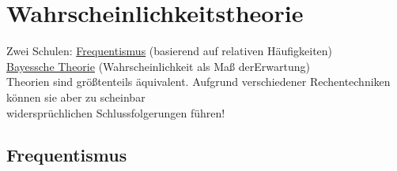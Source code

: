 \section{Wahrscheinlichkeitstheorie}
\begin{tabbing}
Zwei Schulen: \= \underline{Frequentismus} (basierend auf relativen Häufigkeiten)\\
\> \underline{Bayessche Theorie} (Wahrscheinlichkeit als Maß derErwartung)\\
Theorien sind größtenteils äquivalent. Aufgrund verschiedener Rechentechniken können sie aber zu scheinbar\\ widersprüchlichen Schlussfolgerungen führen!
\end{tabbing}

\subsection{Frequentismus}
